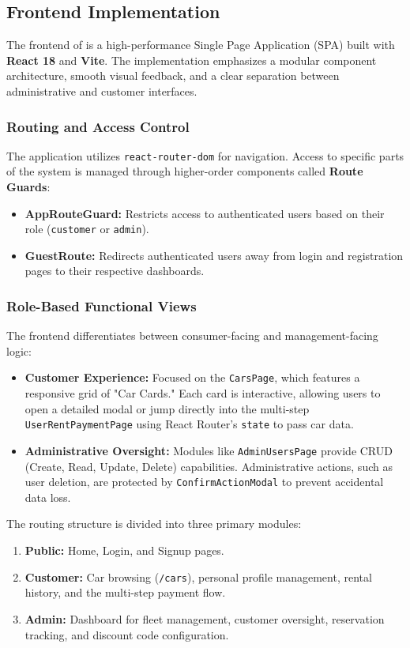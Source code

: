 \subsection{Frontend Implementation}

The frontend of \projectTitle{} is a high-performance Single Page Application (SPA) built with \textbf{React 18} and \textbf{Vite}. The implementation emphasizes a modular component architecture, smooth visual feedback, and a clear separation between administrative and customer interfaces.




\subsubsection{Routing and Access Control}
The application utilizes \texttt{react-router-dom} for navigation. 
Access to specific parts of the system is managed through higher-order components called \textbf{Route Guards}:
\begin{itemize}
    \item \textbf{AppRouteGuard:} Restricts access to authenticated users based on their role (\texttt{customer} or \texttt{admin}).
    \item \textbf{GuestRoute:} Redirects authenticated users away from login and registration pages to their respective dashboards.
\end{itemize}


\subsubsection{Role-Based Functional Views}
The frontend differentiates between consumer-facing and management-facing logic:
\begin{itemize}
    \item \textbf{Customer Experience:} Focused on the \texttt{CarsPage}, which features a responsive grid of "Car Cards." Each card is interactive, allowing users to open a detailed modal or jump directly into the multi-step \texttt{UserRentPaymentPage} using React Router's \texttt{state} to pass car data.
    \item \textbf{Administrative Oversight:} Modules like \texttt{AdminUsersPage} provide CRUD (Create, Read, Update, Delete) capabilities. Administrative actions, such as user deletion, are protected by \texttt{ConfirmActionModal} to prevent accidental data loss.
\end{itemize}

The routing structure is divided into three primary modules:
\begin{enumerate}
    \item \textbf{Public:} Home, Login, and Signup pages.
    \item \textbf{Customer:} Car browsing (\texttt{/cars}), personal profile management, rental history, and the multi-step payment flow.
    \item \textbf{Admin:} Dashboard for fleet management, customer oversight, reservation tracking, and discount code configuration.
\end{enumerate}

